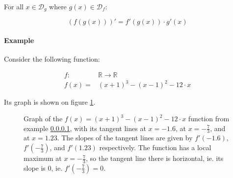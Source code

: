 \documentclass{article}
\begin{document}
              For all $x \in \mathcal{D}_g$ where $g(x) \in \mathcal{D}_f$:

              $$(f(g(x)))' = f'(g(x)) \cdot g'(x)$$

          \paragraph{Example} \label{parsinglevarexample}

            Consider the following function:

            \begin{align*}
              f : & \mathbb{R} \rightarrow \mathbb{R} \\
              f(x) = & (x+1)^3 - (x-1)^2 - 12 \cdot x
            \end{align*}

            Its graph is shown on figure \ref{figsinglevarfunc}.

            \begin{figure}[!htb]
              \centering
              \caption{%
                Graph of the $f(x) = (x+1)^3 - (x-1)^2 - 12 \cdot x$ function
                from example \ref{parsinglevarexample}, with its tangent lines
                at $x=-1.6$, at $x=-\frac{7}{3}$, and at $x=1.23$. The slopes
                of the tangent lines are given by
                $f'(-1.6)$, $f'(-\frac{7}{3})$, and $f'(1.23)$ respectively.
                The function has a local maximum at $x=-\frac{7}{3}$, so the
                tangent line there is horizontal, ie. its slope is $0$, ie.
                $f'(-\frac{7}{3}) = 0$.
              } \label{figsinglevarfunc}
            \end{figure}
\end{document}
